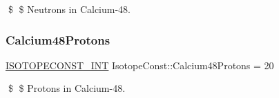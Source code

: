 \$ \$ Neutrons in Calcium-\/48. \mbox{\label{group___isotope_const-_calcium-_ca48_gabbb5e5f27e7040c67047019f4320e051}} 
\subsubsection{\texorpdfstring{Calcium48\+Protons}{Calcium48Protons}}
{\footnotesize\ttfamily \mbox{\hyperlink{group___isotope_const-_macros_ga5f18360b3e99483a35c32d789e62621c}{I\+S\+O\+T\+O\+P\+E\+C\+O\+N\+S\+T\+\_\+\+I\+NT}} Isotope\+Const\+::\+Calcium48\+Protons = 20}

\$ \$ Protons in Calcium-\/48. 